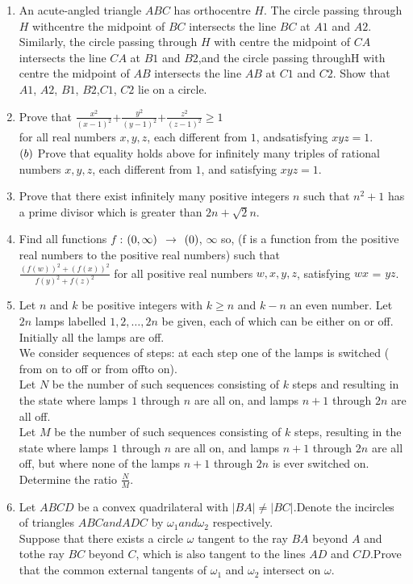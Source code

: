 \documentclass[12pt-letter paper]{article}
\begin{document}
\begin{enumerate}
\item An acute-angled triangle $ABC$ has orthocentre $H$. The circle passing through $H$ withcentre the midpoint of $BC$ intersects the line $BC$ at $A1$ and $A2$. Similarly, the circle passing through $H$ with centre the midpoint of $CA$ intersects the line $CA$ at $B1$ and $B2$,and the circle passing throughH with centre the midpoint of $AB$ intersects the line $AB$ at $C1$ and $C2$. Show that $A1$, $A2$, $B1$, $B2$,$C1$, $C2$ lie on a circle.
\item Prove that 
$\frac{x^2}{{(x-1)}^{2}}$+$\frac{y^2}{{(y-1)}^{2}}$+$\frac{z^2}{{(z-1)}^{2}} \geq 1$ \\ 
for all real numbers $x, y, z$, each different from $1$, andsatisfying $xyz = 1$.\\$\left(b\right)$ Prove that equality holds above for infinitely many triples of rational numbers $x, y, z$, each different from $1$, and satisfying $xyz=1$.
\item Prove that there exist infinitely many positive integers $n$ such that $n^2+1$ has a prime divisor which is greater than $2n+\sqrt2n$.
\item Find all functions $f$ : $\left(0,\infty\right)$ $\rightarrow$ $\left(0\right)$, $\infty$  so, (f is a function from the positive real numbers to the positive real numbers) such that \\
	$\frac{(f(w))^2 + (f(x))^2} {f(y)^2 + f(z)^2 }$
	for all positive real numbers $w, x, y, z$, satisfying $wx$ = $yz$.
\item  Let $n$ and $k$ be positive integers with $k\geq n$ and $k-n$ an even number. Let $2n$ lamps labelled $1, 2,\dots, 2n$ be given, each of which can be either on or off. Initially all the lamps are off.\\

	We consider sequences of steps: at each step one of the lamps is switched ( from on to off or from offto on).\\

Let $N$ be the number of such sequences consisting of $k$ steps and resulting in the state where lamps $1$ through $n$ are all on, and lamps $n + 1$ through $2n$ are all off.\\

Let $M$ be the number of such sequences consisting of $k$ steps, resulting in the state where lamps $1$ through $n$ are all on, and lamps $n + 1$ through $2n$ are all off, but where none of the lamps $n + 1$ through $2n$ is ever switched on.\\
	Determine the ratio $\frac{N}{M}$.

\item Let $ABCD$ be a convex quadrilateral with $|BA| \neq |BC|$.Denote the incircles of triangles $ABC and ADC$ by $\omega_1 and \omega_2$ respectively.\\
Suppose that there exists a circle $\omega$ tangent to the ray $BA$ beyond $A$ and tothe ray $BC$ beyond $C$, which is also tangent to the lines $AD$ and $CD$.Prove that the common external tangents of $\omega_1$ and $\omega_2$ intersect on $\omega$.
\end{enumerate}
\end{document}
